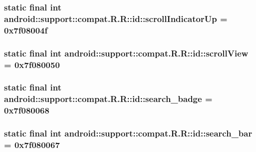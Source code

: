 \hypertarget{classandroid_1_1support_1_1compat_1_1_r_1_1id_7361a776501418ae59220913dd6986fc}{
\subsubsection[{scrollIndicatorUp}]{\setlength{\rightskip}{0pt plus 5cm}static final int android::support::compat.R.R::id::scrollIndicatorUp = 0x7f08004f}}
\label{classandroid_1_1support_1_1compat_1_1_r_1_1id_7361a776501418ae59220913dd6986fc}


\hypertarget{classandroid_1_1support_1_1compat_1_1_r_1_1id_932e25b2e4f0153d4f0f554b5ca53216}{
\subsubsection[{scrollView}]{\setlength{\rightskip}{0pt plus 5cm}static final int android::support::compat.R.R::id::scrollView = 0x7f080050}}
\label{classandroid_1_1support_1_1compat_1_1_r_1_1id_932e25b2e4f0153d4f0f554b5ca53216}


\hypertarget{classandroid_1_1support_1_1compat_1_1_r_1_1id_c2dfe69bc0700795a202e4df32603240}{
\subsubsection[{search\_\-badge}]{\setlength{\rightskip}{0pt plus 5cm}static final int android::support::compat.R.R::id::search\_\-badge = 0x7f080068}}
\label{classandroid_1_1support_1_1compat_1_1_r_1_1id_c2dfe69bc0700795a202e4df32603240}


\hypertarget{classandroid_1_1support_1_1compat_1_1_r_1_1id_cd137ad716fd8c1d8ea22e5eb4da7954}{
\subsubsection[{search\_\-bar}]{\setlength{\rightskip}{0pt plus 5cm}static final int android::support::compat.R.R::id::search\_\-bar = 0x7f080067}}
\label{classandroid_1_1support_1_1compat_1_1_r_1_1id_cd137ad716fd8c1d8ea22e5eb4da7954}


